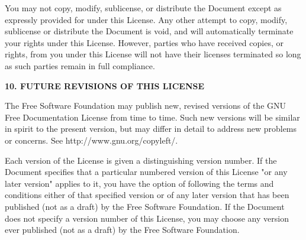 \documentclass[a4paper,12pt]{book}
\begin{document}
You may not copy, modify, sublicense, or distribute the Document except
as expressly provided for under this License.  Any other attempt to
copy, modify, sublicense or distribute the Document is void, and will
automatically terminate your rights under this License.  However,
parties who have received copies, or rights, from you under this
License will not have their licenses terminated so long as such
parties remain in full compliance.


\begin{center}
{\Large\bf 10. FUTURE REVISIONS OF THIS LICENSE}
\end{center}


The Free Software Foundation may publish new, revised versions
of the GNU Free Documentation License from time to time.  Such new
versions will be similar in spirit to the present version, but may
differ in detail to address new problems or concerns.  See
http://www.gnu.org/copyleft/.

Each version of the License is given a distinguishing version number.
If the Document specifies that a particular numbered version of this
License "or any later version" applies to it, you have the option of
following the terms and conditions either of that specified version or
of any later version that has been published (not as a draft) by the
Free Software Foundation.  If the Document does not specify a version
number of this License, you may choose any version ever published (not
as a draft) by the Free Software Foundation.
\end{document}

